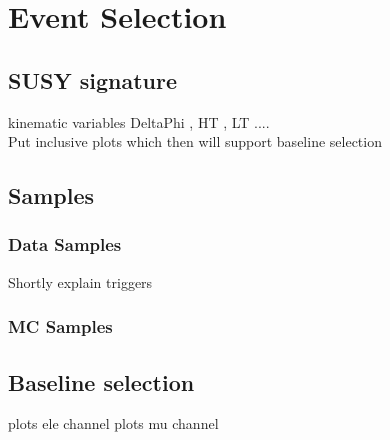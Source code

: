 \chapter{Event Selection}
\section{SUSY signature}
kinematic variables DeltaPhi , HT , LT .... \\
Put inclusive plots which then will support  baseline selection
\newpage
\section{Samples}
\subsection{Data Samples}
Shortly explain triggers
\newpage
\subsection{MC Samples}
\newpage
\section{Baseline selection}
\newpage
plots ele channel
\newpage
plots mu channel
\newpage
